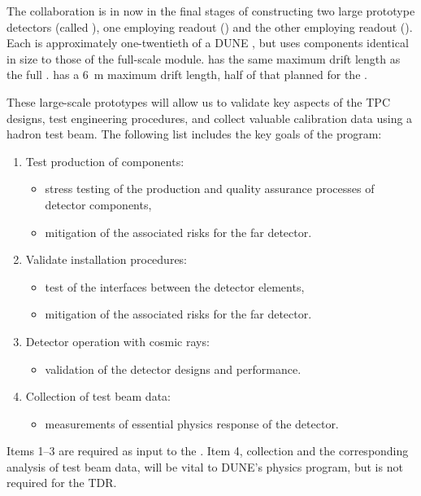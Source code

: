 The collaboration is in now in the final stages of constructing two large prototype detectors (called ), one employing \single readout () and the other employing \dual readout (). Each is approximately one-twentieth of a DUNE , but uses components identical in size to those of the full-scale module.  has the same \spmaxdrift maximum drift length as the full .  has a \SI{6}{m} maximum drift length, half of that planned for the . 

These large-scale prototypes will allow us to validate key aspects of the TPC designs, test engineering procedures, and collect valuable calibration data using a hadron test beam. The following list includes the key goals of the  program:
\begin{enumerate}
\item Test production of components:
\begin{itemize}
\item stress testing of the production and quality
assurance processes of detector components,
\item mitigation of the associated risks for the far detector.
\end{itemize}
\item Validate installation procedures:
\begin{itemize}
\item test of the interfaces between the detector elements,
\item mitigation of the associated risks for the far detector.
\end{itemize}
\item Detector operation with cosmic rays:
\begin{itemize}
\item validation of the detector designs and
performance.
\end{itemize}
\item Collection of test beam data:
\begin{itemize}
\item measurements of essential physics response of the detector.
\end{itemize}
\end{enumerate}

Items \numrange{1}{3} are required as input to the . Item 4, collection and the corresponding analysis of test beam data, will be vital to DUNE's physics program, but is not required for the TDR.

